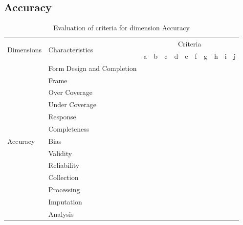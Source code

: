 \subsection{Accuracy}

\begin{table}[htbp]
    \centering

    \begin{tabular}{llrrrrrrrrrr}
        \toprule
        \multirow{2}{*}{Dimensions} & \multirow{2}{*}{Characteristics}  & \multicolumn{10}{c}{Criteria}         \\ \cmidrule(lr){3-12}
                                    &                                   & a & b & c & d & e & f & g & h & i & j \\ \midrule
        \multirow{13}{*}{Accuracy}  & Form Design and Completion        &   &   &   &   &   &   &   &   &   &   \\
                                    & Frame                             &   &   &   &   &   &   &   &   &   &   \\
                                    & Over Coverage                     &   &   &   &   &   &   &   &   &   &   \\
                                    & Under Coverage                    &   &   &   &   &   &   &   &   &   &   \\
                                    & Response                          &   &   &   &   &   &   &   &   &   &   \\
                                    & Completeness                      &   &   &   &   &   &   &   &   &   &   \\
                                    & Bias                              &   &   &   &   &   &   &   &   &   &   \\
                                    & Validity                          &   &   &   &   &   &   &   &   &   &   \\
                                    & Reliability                       &   &   &   &   &   &   &   &   &   &   \\
                                    & Collection                        &   &   &   &   &   &   &   &   &   &   \\
                                    & Processing                        &   &   &   &   &   &   &   &   &   &   \\
                                    & Imputation                        &   &   &   &   &   &   &   &   &   &   \\
                                    & Analysis                          &   &   &   &   &   &   &   &   &   &   \\
        \bottomrule
    \end{tabular}

    \caption{Evaluation of criteria for dimension Accuracy}
    \label{table:accuracy-benchmark}
\end{table}
\FloatBarrier

